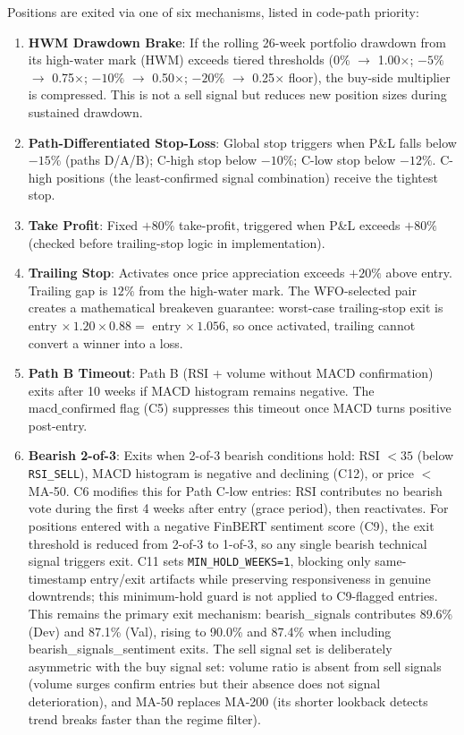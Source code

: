 \documentclass[11pt,twoside,a4paper]{article}
\begin{document}
Positions are exited via one of six mechanisms, listed in code-path priority:

\begin{enumerate}[(1)]
    \item \textbf{HWM Drawdown Brake}: If the rolling 26-week portfolio drawdown from its high-water mark (HWM) exceeds tiered thresholds (0\% $\to$ 1.00$\times$; $-5\%$ $\to$ 0.75$\times$; $-10\%$ $\to$ 0.50$\times$; $-20\%$ $\to$ 0.25$\times$ floor), the buy-side multiplier is compressed. This is not a sell signal but reduces new position sizes during sustained drawdown.
    \item \textbf{Path-Differentiated Stop-Loss}: Global stop triggers when P\&L falls below $-15\%$ (paths D/A/B); C-high stop below $-10\%$; C-low stop below $-12\%$. C-high positions (the least-confirmed signal combination) receive the tightest stop.
    \item \textbf{Take Profit}: Fixed $+80\%$ take-profit, triggered when P\&L exceeds $+80\%$ (checked before trailing-stop logic in implementation).
    \item \textbf{Trailing Stop}: Activates once price appreciation exceeds $+20\%$ above entry. Trailing gap is $12\%$ from the high-water mark. The WFO-selected pair creates a mathematical breakeven guarantee: worst-case trailing-stop exit is entry $\times\, 1.20 \times 0.88 = $ entry $\times\, 1.056$, so once activated, trailing cannot convert a winner into a loss.
    \item \textbf{Path B Timeout}: Path B (RSI + volume without MACD confirmation) exits after 10 weeks if MACD histogram remains negative. The $\text{macd\_confirmed}$ flag (C5) suppresses this timeout once MACD turns positive post-entry.
    \item \textbf{Bearish 2-of-3}: Exits when 2-of-3 bearish conditions hold: RSI $< 35$ (below \texttt{RSI\_SELL}), MACD histogram is negative and declining (C12), or price $<$ MA-50. C6 modifies this for Path C-low entries: RSI contributes no bearish vote during the first 4 weeks after entry (grace period), then reactivates. For positions entered with a negative FinBERT sentiment score (C9), the exit threshold is reduced from 2-of-3 to 1-of-3, so any single bearish technical signal triggers exit. C11 sets \texttt{MIN\_HOLD\_WEEKS=1}, blocking only same-timestamp entry/exit artifacts while preserving responsiveness in genuine downtrends; this minimum-hold guard is not applied to C9-flagged entries. This remains the primary exit mechanism: bearish\_signals contributes 89.6\% (Dev) and 87.1\% (Val), rising to 90.0\% and 87.4\% when including bearish\_signals\_sentiment exits. The sell signal set is deliberately asymmetric with the buy signal set: volume ratio is absent from sell signals (volume surges confirm entries but their absence does not signal deterioration), and MA-50 replaces MA-200 (its shorter lookback detects trend breaks faster than the regime filter).
\end{enumerate}
\end{document}
